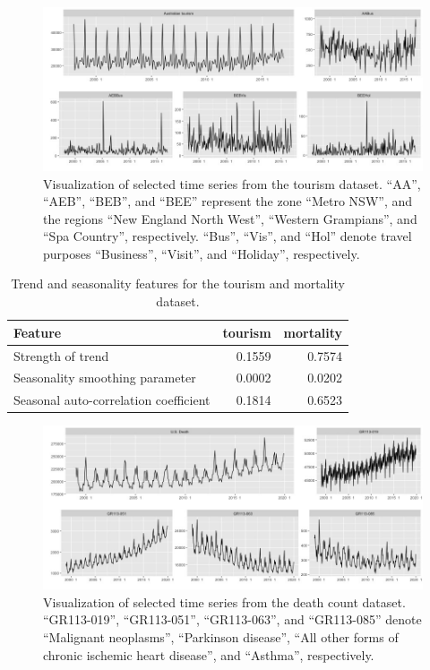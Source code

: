 \documentclass[a4paper,review,12pt,authoryear]{elsarticle}
\begin{document}
\begin{figure}[h!]
    \centering
    \includegraphics[width=\textwidth]{../figures/Figure2.jpg}
    \caption{Visualization of selected time series from the tourism dataset. ``AA'', ``AEB'', ``BEB'', and ``BEE'' represent the zone ``Metro NSW'', and the regions ``New England North West'', ``Western Grampians'', and ``Spa Country'', respectively. ``Bus'', ``Vis'', and ``Hol'' denote travel purposes ``Business'', ``Visit'', and ``Holiday'', respectively.}
    \label{fig:tourism}
\end{figure}


\begin{table}[h!]
    \centering
    \caption{\label{tab:features}Trend and seasonality features for the tourism  and mortality dataset.}
    \begin{tabular}{lrr}\toprule
        Feature & tourism &  mortality\\ \midrule
        Strength of trend & 0.1559 & 0.7574 \\
        Seasonality smoothing parameter & 0.0002 & 0.0202 \\ 
        Seasonal auto-correlation coefficient &0.1814  &0.6523  \\ 
 \bottomrule
    \end{tabular}
\end{table}


\begin{figure}[h!]
    \centering
    \vspace{0.2in}
    \includegraphics[width=\textwidth]{../figures/Figure3.jpg}
    \caption{{Visualization of selected time series from the death count dataset.} ``GR113-019'', ``GR113-051'',  ``GR113-063'', and ``GR113-085'' denote ``Malignant neoplasms'', ``Parkinson disease'', ``All other forms of chronic ischemic heart disease'', and ``Asthma'', respectively.}
    \label{fig:mortality}
\end{figure}
\end{document}
